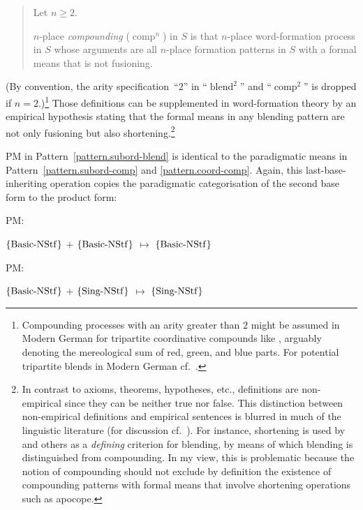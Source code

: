 \documentclass[output=paper
  ,nobabel
  ,draftmode
  ,colorlinks, citecolor=brown
]{langscibook}
\begin{document}
\begin{quotation}
\begin{definition}
\label{definition.compounding}Let $n≥2$.

\noindent $n$-place \emph{compounding} ($\operatorname{comp}^{n}$) in $S$ is that $n$-place word-formation process in $S$ whose arguments are all $n$-place formation patterns in $S$ with a formal means that is not fusioning.
\end{definition}
\end{quotation} (By convention, the arity specification ``$2$'' in ``$\operatorname{blend}^{2}$'' and ``$\operatorname{comp}^{2}$'' is dropped if $n=2$.)\footnote{Compounding processes with an arity greater than $2$ might be assumed in Modern German for tripartite coordinative
compounds like \emph{},
arguably denoting the mereological sum of red, green, and blue parts. For
potential tripartite blends in Modern German cf.\ \citet[Section 4.6]{friedrich:2008:kontamination:form}.} Those
definitions can be supplemented in word-formation theory by an empirical
hypothesis stating that the formal means in any blending pattern are not only
fusioning but also shortening.\footnote{In contrast to axioms, theorems, hypotheses,
etc., definitions are non-empirical since they can be neither true nor false.
This distinction between non-empirical definitions and empirical sentences is
blurred in much of the linguistic literature (for discussion cf.\ \citealt[Section 2.2]{budde:2012:woerter:saetze}). For
instance, shortening is used by \citet[78]{mueller:et:al:2011:kontamination} and others as a
\emph{defining} criterion for blending, by means of which blending is
distinguished from compounding. In my view, this is problematic because the
notion of compounding should not exclude by definition the existence of
compounding patterns with formal means that involve shortening operations such
as apocope.}

PM in Pattern \ref{pattern.subord-blend} is
identical to the paradigmatic means in Pattern \ref{pattern.subord-comp} and \ref{pattern.coord-comp}. Again, this last-base-inheriting operation copies
the paradigmatic categorisation of the second base form to the product form:
\begin{exe}
\ex \begin{xlist}
\ex \raggedright
\begin{labeledlist}{PM:}
\item[PM:] \raggedright $\left\{\smash{\operatorname{Basic-NStf}}\right\}$ $+$ $\left\{\smash{\operatorname{Basic-NStf}}\right\}$ $↦$ $\left\{\smash{\operatorname{Basic-NStf}}\right\}$
\end{labeledlist}
\ex \raggedright
\begin{labeledlist}{PM:}
\item[PM:] \raggedright $\left\{\smash{\operatorname{Basic-NStf}}\right\}$ $+$ $\left\{\smash{\operatorname{Sing-NStf}}\right\}$ $↦$ $\left\{\smash{\operatorname{Sing-NStf}}\right\}$
\end{labeledlist}
\end{xlist}
\end{exe}
\end{document}

